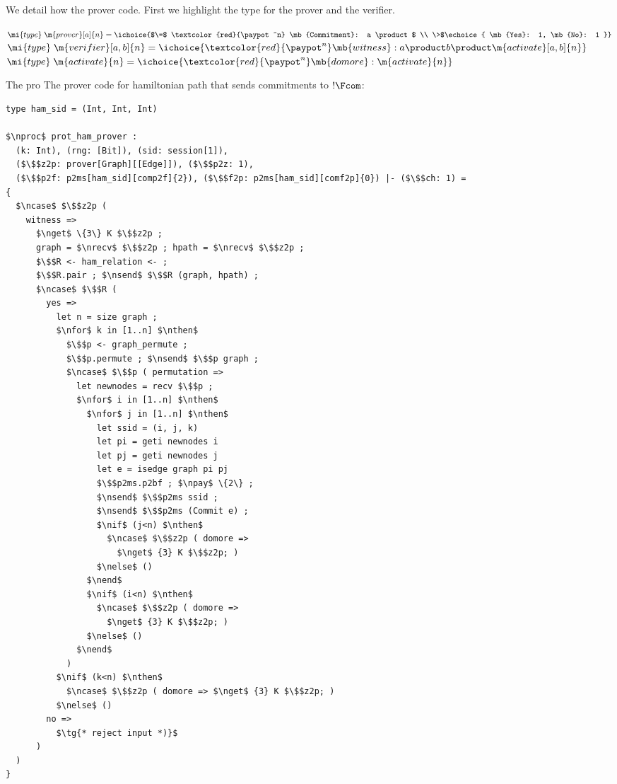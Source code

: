 We detail how the prover code. First we highlight the type for the prover and the verifier.
\begin{tabbing}
    $\mi{type} \; \m{prover}[a]\{n\} = \ichoice{$\=$ \textcolor{red}{\paypot^n} \mb{Commitment}: a \product$ \\ 
    \>$\echoice{ \mb{Yes}: 1, \mb{No}: 1 }}$ \\
    $\mi{type} \; \m{verifier}[a,b]\{n\} = \ichoice{ \textcolor{red}{\paypot^n} \mb{witness}: a \product b \product \m{activate}[a,b]\{n\}}$ \\
    $\mi{type} \; \m{activate}\{n\} = \ichoice{ \textcolor{red}{\paypot^n} \mb{domore}: \m{activate}\{n\}}$
\end{tabbing}

The pro
The prover code for hamiltonian path that sends commitments to $!\Fcom$:
\begin{lstlisting}[basicstyle=\footnotesize\BeraMonottFamily, frame=single, mathescape]
type ham_sid = (Int, Int, Int)

$\nproc$ prot_ham_prover :
  (k: Int), (rng: [Bit]), (sid: session[1]),
  ($\$$z2p: prover[Graph][[Edge]]), ($\$$p2z: 1), 
  ($\$$p2f: p2ms[ham_sid][comp2f]{2}), ($\$$f2p: p2ms[ham_sid][comf2p]{0}) |- ($\$$ch: 1) =
{
  $\ncase$ $\$$z2p (
    witness =>
      $\nget$ \{3\} K $\$$z2p ;
      graph = $\nrecv$ $\$$z2p ; hpath = $\nrecv$ $\$$z2p ;
      $\$$R <- ham_relation <- ;
      $\$$R.pair ; $\nsend$ $\$$R (graph, hpath) ;
      $\ncase$ $\$$R (
        yes => 
          let n = size graph ;
          $\nfor$ k in [1..n] $\nthen$
            $\$$p <- graph_permute ;
            $\$$p.permute ; $\nsend$ $\$$p graph ;
            $\ncase$ $\$$p ( permutation =>
              let newnodes = recv $\$$p ;
              $\nfor$ i in [1..n] $\nthen$
                $\nfor$ j in [1..n] $\nthen$
                  let ssid = (i, j, k)
                  let pi = geti newnodes i
                  let pj = geti newnodes j
                  let e = isedge graph pi pj 
                  $\$$p2ms.p2bf ; $\npay$ \{2\} ;
                  $\nsend$ $\$$p2ms ssid ;
                  $\nsend$ $\$$p2ms (Commit e) ;
                  $\nif$ (j<n) $\nthen$
                    $\ncase$ $\$$z2p ( domore => 
                      $\nget$ {3} K $\$$z2p; )
                  $\nelse$ ()
                $\nend$
                $\nif$ (i<n) $\nthen$
                  $\ncase$ $\$$z2p ( domore => 
                    $\nget$ {3} K $\$$z2p; )
                $\nelse$ ()
              $\nend$
            )
          $\nif$ (k<n) $\nthen$
            $\ncase$ $\$$z2p ( domore => $\nget$ {3} K $\$$z2p; )
          $\nelse$ ()
        no => 
          $\tg{* reject input *)}$
      )
  )
}
\end{lstlisting}

